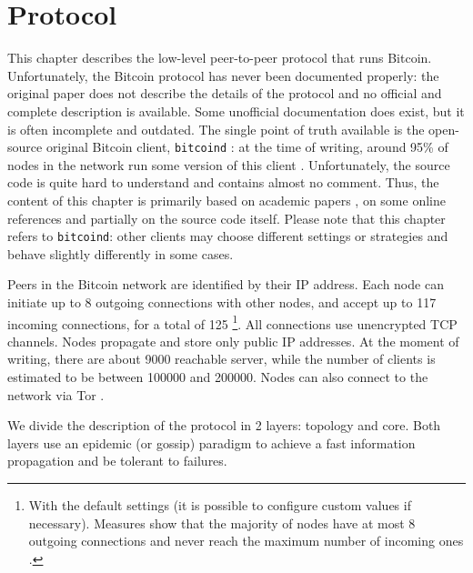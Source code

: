 \chapter{Protocol}
\label{chapter:protocol}
This chapter describes the low-level peer-to-peer protocol that runs Bitcoin.
Unfortunately, the Bitcoin protocol has never been documented properly:
the original paper \cite{bitcoin_2009} does not describe the details of the protocol and no official and complete description is available.
Some unofficial documentation does exist, but it is often incomplete and outdated.
The single point of truth available is the open-source original Bitcoin client, \texttt{bitcoind} \cite{bitcoin_github}:
at the time of writing, around \num{95}\% of nodes in the network run some version of this client \cite{bitnodes}.
Unfortunately, the source code is quite hard to understand and contains almost no comment.
Thus, the content of this chapter is primarily based on academic papers \cite{eclipse_attack_2015, deanonymization_2014}, on some online references \cite{bitcoin_reference, bitcoin_guide} and partially on the source code itself.
Please note that this chapter refers to \texttt{bitcoind}:
other clients may choose different settings or strategies and behave slightly differently in some cases.

\bigskip
Peers in the Bitcoin network are identified by their IP address.
Each node can initiate up to \num{8} outgoing connections with other nodes, and accept up to \num{117} incoming connections, for a total of \num{125} \footnote{With the default settings (it is possible to configure custom values if necessary). Measures show that the majority of nodes have at most \num{8} outgoing connections and never reach the maximum number of incoming ones \cite{discovering_influential_nodes_2014}.}.
All connections use unencrypted TCP channels.
Nodes propagate and store only public IP addresses.
At the moment of writing, there are about \num{9000} reachable server, while the number of clients is estimated to be between \num{100000} and \num{200000}.
Nodes can also connect to the network via Tor \cite{bicoin_tor}.

\bigskip
We divide the description of the protocol in \num{2} layers: topology and core.
Both layers use an epidemic (or gossip) paradigm \cite{gossip_1987} to achieve a fast information propagation and be tolerant to failures.


